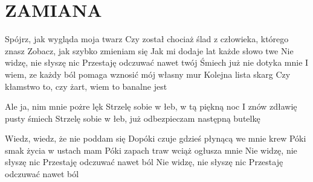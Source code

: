 \documentclass[../../../songbook.tex]{subfiles}
\begin{document}
\TabPositions{8cm} %
\section*{ZAMIANA}
{}
\vspace{0.5cm}
Spójrz, jak wygląda moja twarz							 \newline
Czy został chociaż ślad z człowieka, którego znasz		 \newline  
Zobacz, jak szybko zmieniam się							 \newline
Jak mi dodaje lat każde słowo twe							 \newline
Nie widzę, nie słyszę nic							 \newline
Przestaję odczuwać nawet twój							 \newline
Śmiech już nie dotyka mnie 							 \newline
I wiem, ze każdy ból pomaga wznosić mój własny mur							 \newline
Kolejna lista skarg							 \newline
Czy kłamstwo to, czy żart, wiem to banalne jest							 \newline

\-\hspace{1cm} Ale ja, nim mnie pożre lęk					 \newline
\-\hspace{1cm} Strzelę sobie w łeb, w tą piękną noc			 \newline
\-\hspace{1cm} I znów zdławię pusty śmiech 							 \newline
\-\hspace{1cm} Strzelę sobie w łeb, już odbezpieczam następną butelkę							 \newline

Wiedz, wiedz, że nie poddam się							 \newline
Dopóki czuje gdzieś płynącą we mnie krew							 \newline
Póki smak życia w ustach mam							 \newline
Póki zapach traw wciąż ogłusza mnie 							 \newline
Nie widzę, nie słyszę nic							 \newline
Przestaję odczuwać nawet ból							 \newline
Nie widzę, nie słyszę nic							 \newline
Przestaję odczuwać nawet ból							 \newline
     
\end{document}

